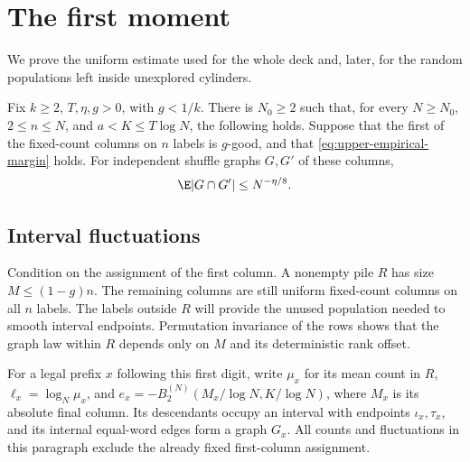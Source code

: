 \section{The first moment}\label{sec:upper-first}
We prove the uniform estimate used for the whole deck and, later, for
the random populations left inside unexplored cylinders.

\begin{proposition}\label{prop:upper-first}
Fix $k\ge2$, $T,\eta,g>0$, with $g<1/k$. There is $N_0\ge2$ such
that, for every $N\ge N_0$, $2\le n\le N$, and
$a<K\le T\log N$, the following holds. Suppose that the first of
the fixed-count columns on $n$ labels is $g$-good, and that
\eqref{eq:upper-empirical-margin} holds. For independent shuffle
graphs $G,G'$ of these columns,
\begin{equation}\label{eq:upper-first}
 \E|G\cap G'|\le N^{-\eta/8}.
\end{equation}
\end{proposition}

\subsection{Interval fluctuations}
Condition on the assignment of the first column. A nonempty pile
$R$ has size $M\le(1-g)n$. The remaining columns are still uniform
fixed-count columns on all $n$ labels. The labels outside $R$ will
provide the unused population needed to smooth interval endpoints.
Permutation invariance of the rows shows that the graph law within
$R$ depends only on $M$ and its deterministic rank offset.

For a legal prefix $x$ following this first digit, write $\mu_x$ for
its mean count in $R$, $\ell_x=\log_N\mu_x$, and
$e_x=-B^{(N)}_2(M_x/\log N,K/\log N)$, where $M_x$ is its absolute final column.
Its descendants occupy an interval with endpoints $\iota_x,\tau_x$,
and its internal equal-word edges form a graph $G_x$.
All counts and fluctuations in this paragraph exclude the already
fixed first-column assignment.


